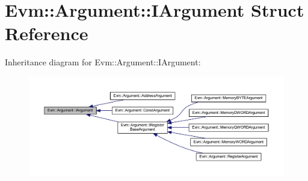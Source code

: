 \hypertarget{struct_evm_1_1_argument_1_1_i_argument}{}\section{Evm\+:\+:Argument\+:\+:I\+Argument Struct Reference}
\label{struct_evm_1_1_argument_1_1_i_argument}


Inheritance diagram for Evm\+:\+:Argument\+:\+:I\+Argument\+:
\nopagebreak
\begin{figure}[H]
\begin{center}
\leavevmode
\includegraphics[width=350pt]{struct_evm_1_1_argument_1_1_i_argument__inherit__graph}
\end{center}
\end{figure}
